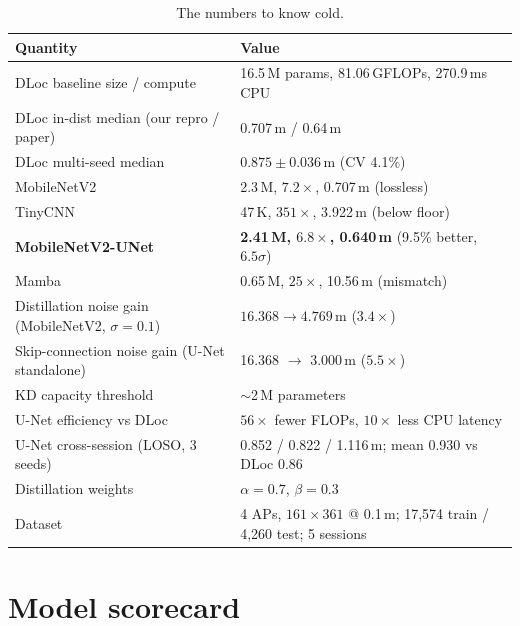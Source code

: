 \begin{table}[H]
\centering
\small
\caption{The numbers to know cold.}
\begin{tabular}{@{}ll@{}}
\toprule
\textbf{Quantity} & \textbf{Value} \\
\midrule
DLoc baseline size / compute & 16.5\,M params, 81.06\,GFLOPs, 270.9\,ms CPU \\
DLoc in-dist median (our repro / paper) & 0.707\,m / 0.64\,m \\
DLoc multi-seed median & $0.875 \pm 0.036$\,m (CV 4.1\%) \\
MobileNetV2 & 2.3\,M, $7.2\times$, 0.707\,m (lossless) \\
TinyCNN & 47\,K, $351\times$, 3.922\,m (below floor) \\
\textbf{MobileNetV2-UNet} & \textbf{2.41\,M, $6.8\times$, 0.640\,m} (9.5\% better, $6.5\sigma$) \\
Mamba & 0.65\,M, $25\times$, 10.56\,m (mismatch) \\
Distillation noise gain (MobileNetV2, $\sigma{=}0.1$) & $16.368 \to 4.769$\,m ($3.4\times$) \\
Skip-connection noise gain (U-Net standalone) & 16.368 $\to$ 3.000\,m ($5.5\times$) \\
KD capacity threshold & $\sim$2\,M parameters \\
U-Net efficiency vs DLoc & $56\times$ fewer FLOPs, $10\times$ less CPU latency \\
U-Net cross-session (LOSO, 3 seeds) & 0.852 / 0.822 / 1.116\,m; mean 0.930 vs DLoc 0.86 \\
Distillation weights & $\alpha = 0.7$, $\beta = 0.3$ \\
Dataset & 4 APs, $161\times361$ @ 0.1\,m; 17{,}574 train / 4{,}260 test; 5 sessions \\
\bottomrule
\end{tabular}
\end{table}

\section{Model scorecard}
\label{app:glossary:scorecard}

